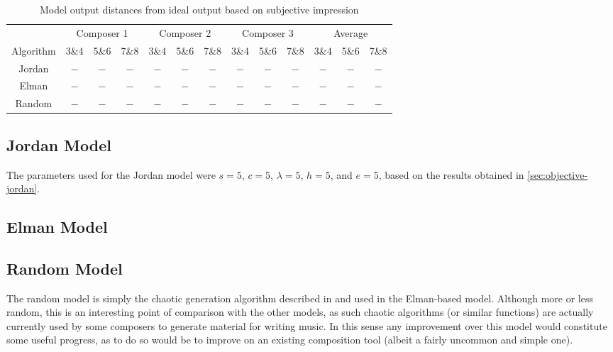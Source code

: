 \documentclass[ author={Stephen Livermore-Tozer},
				supervisor={Dr. Peter Flach},
				degree={MEng},
				title={Algorithmic Co-composition Using Machine Learning},
				subtitle={},
				type={research},
				year={2016} ]{dissertation}
\begin{document}
	\begin{table}[htp]
		\begin{center}
			\begin{tabular}{ccccccccccccc}
				\toprule
				& \multicolumn{3}{c}{Composer 1}& \multicolumn{3}{c}{Composer 2}& \multicolumn{3}{c}{Composer 3}& \multicolumn{3}{c}{Average}\\
				Algorithm& 3\&4 & 5\&6 & 7\&8 & 3\&4 & 5\&6 & 7\&8 & 3\&4 & 5\&6 & 7\&8 & 3\&4 & 5\&6 & 7\&8 \\
				\hline
				Jordan & $-$ & $-$ & $-$ & $-$ & $-$ & $-$ & $-$ & $-$ & $-$ & $-$ & $-$ & $-$\\
				Elman & $-$ & $-$ & $-$ & $-$ & $-$ & $-$ & $-$ & $-$ & $-$ & $-$ & $-$ & $-$\\
				Random & $-$ & $-$ & $-$ & $-$ & $-$ & $-$ & $-$ & $-$ & $-$ & $-$ & $-$ & $-$\\
				\bottomrule
			\end{tabular}
		\end{center}
		\caption{Model output distances from ideal output based on subjective impression}
		\label{tab:subjective-results}
	\end{table}
	
	\subsection{Jordan Model}
	
	The parameters used for the Jordan model were $s = 5$, $c = 5$, $\lambda = 5$, $h = 5$, and $e = 5$, based on the results obtained in \ref{sec:objective-jordan}. 
	
	
	\subsection{Elman Model}
	
	
	\subsection{Random Model}

	The random model is simply the chaotic generation algorithm described in \cite{coca2010characterizing} and used in the Elman-based model. Although more or less random, this is an interesting point of comparison with the other models, as such chaotic algorithms (or similar functions) are actually currently used by some composers to generate material for writing music. In this sense any improvement over this model would constitute some useful progress, as to do so would be to improve on an existing composition tool (albeit a fairly uncommon and simple one).
\end{document}
